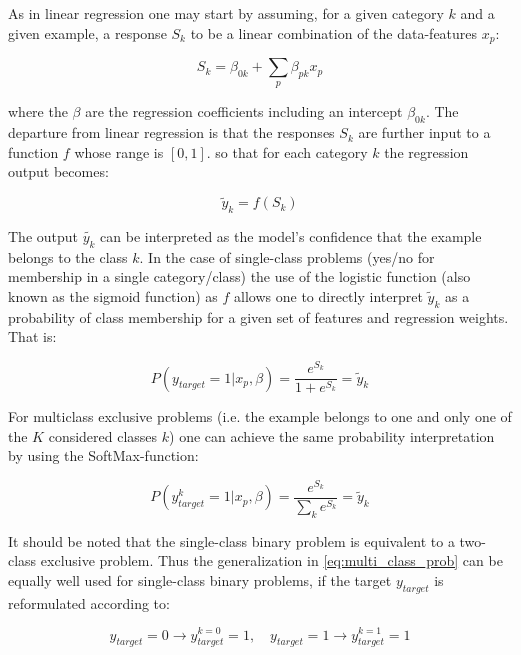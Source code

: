 \documentclass[reprint, english, nofootinbib]{revtex4-2}
\begin{document}
As in linear regression one may start by assuming, for a given category $k$ and a given example, a response $S_k$ to be a linear combination of the data-features $x_{p}$:

\begin{equation}
\label{eq:logreg_input}
S_k = \beta_{0k} + \sum_p \beta_{pk}  x_p
\end{equation}

where the $\beta$ are the regression coefficients including an intercept $\beta_{0k}$. The departure from linear regression is that the responses $S_k$ are further input to a function $f$ whose range is $[0,1]$. so that for each category $k$ the regression output becomes:

\begin{equation}
\label{eq:logreg_output}
\tilde{y}_k = f(S_k)
\end{equation}

The output $\tilde{y_k}$ can be interpreted as the model's confidence that the example belongs to the class $k$. In the case of single-class problems (yes/no for membership in a single category/class) the use of the logistic function (also known as the sigmoid function) as $f$ allows one to directly interpret $\tilde{y}_k$ as a probability of class membership for a given set of features and regression weights. That is:

\begin{equation}
\label{eq:single_class_prob}
P(y_{target} = 1 | x_p, \beta) = \frac{e^{S_k}}{1+e^{S_k}} = \tilde{y}_k
\end{equation}

For multiclass exclusive problems (i.e. the example belongs to one and only one of the $K$ considered classes $k$) one can achieve the same probability interpretation by using the SoftMax-function:

\begin{equation}
\label{eq:multi_class_prob}
P(y^k_{target} = 1 | x_p, \beta) = \frac{e^{S_k}}{\sum_k e^{S_k}} = \tilde{y}_k
\end{equation}

It should be noted that the single-class binary problem is equivalent to a two-class exclusive problem. Thus the generalization in \ref{eq:multi_class_prob} can be equally well used for single-class binary problems, if the target $y_{target}$ is reformulated according to:

\begin{equation}
\label{eq:single_to_mult_target}
y_{target} = 0 \rightarrow y_{target}^{k=0} = 1, \quad
y_{target} = 1 \rightarrow y_{target}^{k=1} = 1
\end{equation}
\end{document}
